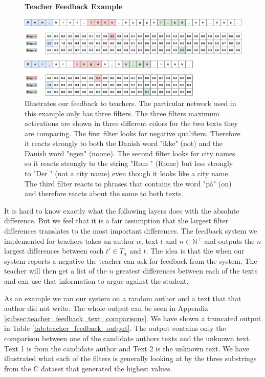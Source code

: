 \begin{figure}
    \centering
    \textbf{Teacher Feedback Example}\par\medskip
    \includegraphics[width=\textwidth]{./pictures/discussion/teacher_feedback_example}
    \caption{Illustrates our feedback to teachers. The
        particular network used in this example only has three filters. The
        three filters maximum activations are shown in three different colors
        for the two texts they are comparing. The first filter looks for
        negative qualifiers. Therefore it reacts strongly to both the Danish
        word "ikke" (not) and the Danish word "ngen" (noone). The second filter
        looks for city names so it reacts strongly to the string "Rom " (Rome)
        but less strongly to "Der " (not a city name) even though it looks like
        a city name. The third filter reacts to phrases that contains the word
        "p\aa " (on) and therefore reacts about the same to both texts.}
    \label{fig:feature_extraction_output_example}
\end{figure}

It is hard to know exactly what the following layers does with the absolute
difference. But we feel that it is a fair assumption that the largest filter
differences translates to the most important differences. The feedback system
we implemented for teachers takes an author $\alpha$, text $t$ and $n \in
\mathbb{N}^+$ and outputs the $n$ largest differences between each $t' \in
T_\alpha$ and $t$. The idea is that the when our system reports a negative the
teacher can ask for feedback from the system. The teacher will then get a list
of the $n$ greatest differences between each of the texts and can use that
information to argue against the student.

As an example we ran our system on a random author and a text that
that author did not write. The whole output can be seen in Appendix
\ref{subsec:teacher_feedback_text_comparisons}. We have shown a truncated
output in Table \ref{tab:teacher_feedback_output}. The output contains only
the comparison between one of the candidate authors texts and the unknown
text. Text 1 is from the candidate author and Text 2 is the unknown text. We
have illustrated what each of the filters is generally looking at by the three
substrings from the \gls{C} dataset that generated the highest values.

